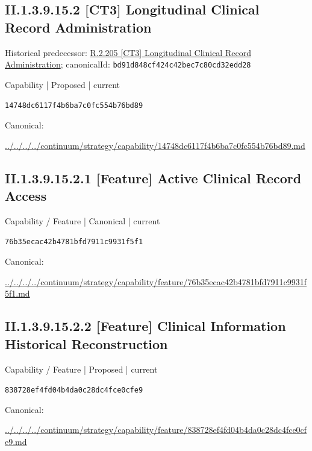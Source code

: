 \documentclass[10pt,a4paper]{article}
\begin{document}
\subsection*{II.1.3.9.15.2 [CT3] Longitudinal Clinical Record Administration}
Historical predecessor: \hyperref[element-bd91d848cf424c42bec7c80cd32edd28]{R.2.205 [CT3] Longitudinal Clinical Record Administration}; canonicalId: \texttt{bd91d848cf424c42bec7c80cd32edd28}\par
\label{element-14748dc6117f4b6ba7c0fc554b76bd89}
{\small Capability | Proposed | current}\par
\texttt{14748dc6117f4b6ba7c0fc554b76bd89}\par
Canonical: \par
{\footnotesize\url{../../../../continuum/strategy/capability/14748dc6117f4b6ba7c0fc554b76bd89.md}}\par
\subsection*{II.1.3.9.15.2.1 [Feature] Active Clinical Record Access}
\label{element-76b35ecac42b4781bfd7911c9931f5f1}
{\small Capability / Feature | Canonical | current}\par
\texttt{76b35ecac42b4781bfd7911c9931f5f1}\par
Canonical: \par
{\footnotesize\url{../../../../continuum/strategy/capability/feature/76b35ecac42b4781bfd7911c9931f5f1.md}}\par
\subsection*{II.1.3.9.15.2.2 [Feature] Clinical Information Historical Reconstruction}
\label{element-838728ef4fd04b4da0c28dc4fce0cfe9}
{\small Capability / Feature | Proposed | current}\par
\texttt{838728ef4fd04b4da0c28dc4fce0cfe9}\par
Canonical: \par
{\footnotesize\url{../../../../continuum/strategy/capability/feature/838728ef4fd04b4da0c28dc4fce0cfe9.md}}\par
\end{document}
